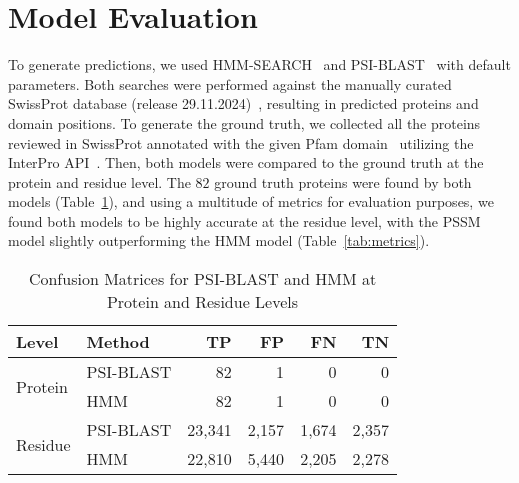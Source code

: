 
\section{Model Evaluation}

To generate predictions, we used HMM-SEARCH~\cite{hmmer} and PSI-BLAST~\cite{psiblast} with default parameters. Both searches were performed against the manually curated SwissProt database (release 29.11.2024)~\cite{swissprot}, resulting in predicted proteins and domain positions. To generate the ground truth, we collected all the proteins reviewed in SwissProt annotated with the given Pfam domain~\cite{pfam} utilizing the InterPro API~\cite{interpro}. Then, both models were compared to the ground truth at the protein and residue level. The $82$ ground truth proteins were found by both models (Table~\ref{tab:confusion}), and using a multitude of metrics for evaluation purposes, we found both models to be highly accurate at the residue level, with the PSSM model slightly outperforming the HMM model (Table~\ref{tab:metrics}).


\begin{table}[h!]
    \centering
    \small
    \caption{Confusion Matrices for PSI-BLAST and HMM at Protein and Residue Levels}
    \label{tab:confusion}
    \begin{tabular}{llrrrr}
        \toprule
        \textbf{Level} & \textbf{Method} & \textbf{TP} & \textbf{FP} & \textbf{FN} & \textbf{TN} \\
        \midrule
        \multirow{2}{*}{Protein} 
        & PSI-BLAST & 82 & 1 & 0 & 0 \\
        & HMM & 82 & 1 & 0 & 0 \\
        \midrule
        \multirow{2}{*}{Residue} 
        & PSI-BLAST & 23,341 & 2,157 & 1,674 & 2,357 \\
        & HMM & 22,810 & 5,440 & 2,205 & 2,278 \\
        \bottomrule
    \end{tabular}
\end{table}

